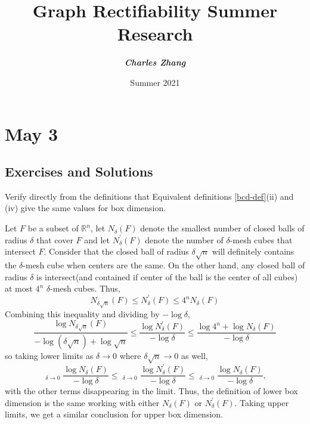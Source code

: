 \documentclass[12pt, a4paper]{article}
\title{\textbf{Graph Rectifiability Summer Research} \\ [0.5cm] \sffamily{Daily Report\\(in reverse chronological order)}}
\author{\textbf{\textit{Charles Zhang}}}
\date{Summer 2021}
\DeclareMathOperator*\lowlim{\underline{lim}}
\begin{document}
\maketitle

{
    \hypersetup{linkcolor=black}
    \tableofcontents
}

\newpage
\section{May 3}
\subsection{Exercises and Solutions}

\begin{customexercise}{2.1}
    Verify directly from the definitions that Equivalent definitions \ref{bcd-def}(ii) and (iv) give the same values for box dimension.
\end{customexercise}

\begin{customsol}{2.1}
    Let $F$ be a subset of $\mathbb{R}^{n}$, let $N_{\delta}(F)$ denote the smallest number of closed balls of radius $\delta$ that cover $F$ and let $N_{\delta}^{\prime}(F)$ denote the number of $\delta$-mesh cubes that intersect $F$. 
    Consider that the closed ball of radius $\delta\sqrt{n}$ will definitely contains the $\delta$-mesh cube when centers are the same. On the other hand, any closed ball of radius $\delta$ is intersect(and contained if center of the ball is the center of all cubes) at most $4^n$ $\delta$-mesh cubes. Thus, 
    $$
    N_{\delta \sqrt{n}}(F) \leq N_{\delta}^{\prime}(F) \leq 4^{n} N_{\delta}(F)
    $$
    Combining this inequality and dividing by $-\log \delta$,
$$
\frac{\log N_{\delta \sqrt{n}}(F)}{-\log (\delta \sqrt{n})+\log \sqrt{n}} \leq \frac{\log N_{\delta}^{\prime}(F)}{-\log \delta} \leq \frac{\log 4^{n}+\log N_{\delta}(F)}{-\log \delta}
$$
so taking lower limits as $\delta \rightarrow 0$ where $\delta\sqrt{n}\rightarrow 0 $ as well,
$$
\lowlim _{\delta \rightarrow 0} \frac{\log N_{\delta}(F)}{-\log \delta} \leq \lowlim _{\delta \rightarrow 0} \frac{\log N_{\delta}^{\prime}(F)}{-\log \delta} \leq \lowlim _{\delta \rightarrow 0} \frac{\log N_{\delta}(F)}{-\log \delta},
$$
with the other terms disappearing in the limit. Thus, the definition of lower box dimension is the same working with either $N_{\delta}(F)$ or $N_{\delta}^{\prime}(F)$. Taking upper limits, we get a similar conclusion for upper box dimension.
\end{customsol}
\end{document}
